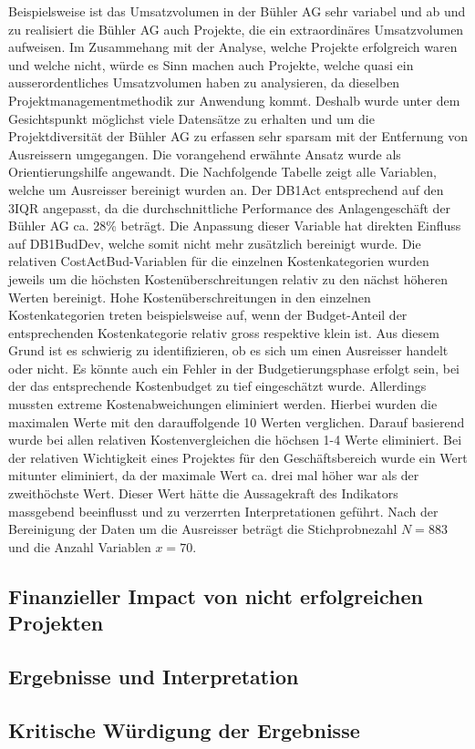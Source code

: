 \newline\newline
Beispielsweise ist das Umsatzvolumen in der Bühler AG sehr variabel und ab und zu realisiert die Bühler AG auch Projekte, die ein extraordinäres Umsatzvolumen aufweisen. Im Zusammehang mit der Analyse, welche Projekte erfolgreich waren und welche nicht, würde es Sinn machen auch Projekte, welche quasi ein ausserordentliches Umsatzvolumen haben zu analysieren, da dieselben Projektmanagementmethodik zur Anwendung kommt. Deshalb wurde unter dem Gesichtspunkt möglichst viele Datensätze zu erhalten und um die Projektdiversität der Bühler AG zu erfassen sehr sparsam mit der Entfernung von Ausreissern umgegangen. Die vorangehend erwähnte Ansatz wurde als Orientierungshilfe angewandt. Die Nachfolgende Tabelle zeigt alle Variablen, welche um Ausreisser bereinigt wurden an. Der DB1Act entsprechend auf den 3IQR angepasst, da die durchschnittliche Performance des Anlagengeschäft der Bühler AG ca. 28\% beträgt. Die Anpassung dieser Variable hat direkten Einfluss auf DB1BudDev, welche somit nicht mehr zusätzlich bereinigt wurde. Die relativen CostActBud-Variablen für die einzelnen Kostenkategorien wurden jeweils um die höchsten Kostenüberschreitungen relativ zu den nächst höheren Werten bereinigt. Hohe Kostenüberschreitungen in den einzelnen Kostenkategorien treten beispielsweise auf, wenn der Budget-Anteil der entsprechenden Kostenkategorie relativ gross respektive klein ist. Aus diesem Grund ist es schwierig zu identifizieren, ob es sich um einen Ausreisser handelt oder nicht. Es könnte auch ein Fehler in der Budgetierungsphase erfolgt sein, bei der das entsprechende Kostenbudget zu tief eingeschätzt wurde. Allerdings mussten extreme Kostenabweichungen eliminiert werden. Hierbei wurden die maximalen Werte mit den darauffolgende 10 Werten verglichen. Darauf basierend wurde bei allen relativen Kostenvergleichen die höchsen 1-4 Werte eliminiert. Bei der relativen Wichtigkeit eines Projektes für den Geschäftsbereich wurde ein Wert mitunter eliminiert, da der maximale Wert ca. drei mal höher war als der zweithöchste Wert. Dieser Wert hätte die Aussagekraft des Indikators massgebend beeinflusst und zu verzerrten Interpretationen geführt. Nach der Bereinigung der Daten um die Ausreisser beträgt die Stichprobnezahl $N = 883 $ und die Anzahl Variablen $ x = 70$.
\subsection{Finanzieller Impact von nicht erfolgreichen Projekten}
\subsection{Ergebnisse und Interpretation}
\subsection{Kritische Würdigung der Ergebnisse}
\newpage	
	


